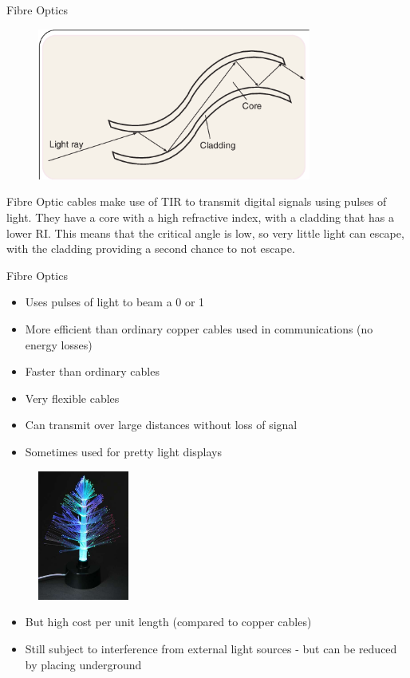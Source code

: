 \documentclass[../Main.tex]{subfiles}
\begin{document}
\begin{frame}{Fibre Optics}
    \begin{figure}
        \centering
        \includegraphics[width=9cm]{Waves_Images/fibreoptics.png}
    \end{figure}
    Fibre Optic cables make use of TIR to transmit digital signals using pulses of light. They have a core with a high refractive index, with a cladding that has a lower RI. This means that the critical angle is low, so very little light can escape, with the cladding providing a second chance to not escape.
\end{frame}

\begin{frame}{Fibre Optics}
    \begin{multicols}{2}

    \begin{itemize}
        \item Uses pulses of light to beam a 0 or 1
        \item More efficient than ordinary copper cables used in communications (no energy losses)
        \item Faster than ordinary cables
        \item Very flexible cables
        \item Can transmit over large distances without loss of signal
        \item Sometimes used for pretty light displays
        
    \end{itemize}
    \columnbreak
    \begin{figure}
        \centering
        \includegraphics[width=3cm]{Waves_Images/fibreopticchristmastree.png}
    \end{figure}
      \end{multicols}
      \begin{itemize}
      \item But high cost per unit length (compared to copper cables)
        \item Still subject to interference from external light sources - but can be reduced by placing underground
      \end{itemize}
\end{frame}
\end{document}
